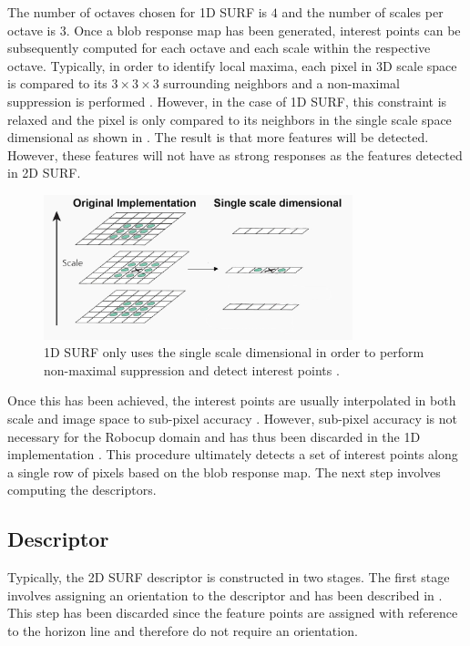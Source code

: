 \documentclass{report}
\begin{document}
The number of octaves chosen for 1D SURF is $4$ and the number of scales per octave is $3$. Once a blob response map has been generated, interest points can be subsequently computed for each octave and each scale within the respective octave. Typically, in order to identify local maxima, each pixel in 3D scale space is compared to its $3 \times 3 \times 3$ surrounding neighbors and a non-maximal suppression is performed \cite{Evans2009}. However, in the case of 1D SURF, this constraint is relaxed and the pixel is only compared to its neighbors in the single scale space dimensional as shown in  \cite{Anderson}. The result is that more features will be detected. However, these features will not have as strong responses as the features detected in 2D SURF.\\

\begin{figure}[h!] 
  \centering
    \includegraphics[width=0.8\textwidth]{../Drawings/methods/SURF1D_Nonmaximal_suppression.jpg}
    \caption{1D SURF only uses the single scale dimensional in order to perform non-maximal suppression and detect interest points \cite{Anderson}.}
    \label{fig:singleScale}
\end{figure}

Once this has been achieved, the interest points are usually interpolated in both scale and image space to sub-pixel accuracy \cite{Evans2009}. However, sub-pixel accuracy is not necessary for the Robocup domain and has thus been discarded in the 1D implementation \cite{Anderson}. This procedure ultimately detects a set of interest points along a single row of pixels based on the blob response map. The next step involves computing the descriptors.\\  

\subsection{Descriptor}
\label{sec:1dsurfDescribe}
Typically, the 2D SURF descriptor is constructed in two stages. The first stage involves assigning an orientation to the descriptor and has been described in . This step has been discarded since the feature points are assigned with reference to the horizon line and therefore do not require an orientation.\\
\end{document}
